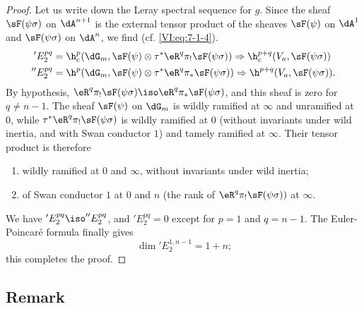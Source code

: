 \documentclass[oneside]{book}
\begin{document}
\begin{proof}[Proof]
Let us write down the Leray spectral sequence for $g$. Since the sheaf $\sF(\psi\sigma)$ on 
$\dA^{n+1}$ is the external tensor product of the sheaves $\sF(\psi)$ on 
$\dA^1$ and $\sF(\psi\sigma)$ on $\dA^n$, we find (cf. \eqref{VI:eq:7-1-4}). 
\begin{align*}
  'E_2^{p q} &= \h_c^p(\dG_m,\sF(\psi)\otimes \tau^\ast \eR^q \pi_! \sF(\psi\sigma)) \Rightarrow \h_c^{p+q}(V_a,\sF(\psi\sigma)) \\
  ''E_2^{p q} &= \h^p(\dG_m,\sF(\psi)\otimes \tau^\ast \eR^q \pi_\ast \sF(\psi\sigma)) \Rightarrow \h^{p+q}(V_a,\sF(\psi\sigma)) \text{.} 
\end{align*}
By hypothesis, 
$\eR^q \pi_! \sF(\psi\sigma) \iso \eR^q \pi_\ast \sF(\psi\sigma)$, and this 
sheaf is zero for $q\ne n-1$. The sheaf $\sF(\psi)$ on $\dG_m$ is 
wildly ramified at $\infty$ and unramified at $0$, while 
$\tau^\ast \eR^q \pi_! \sF(\psi\sigma)$ is wildly ramified at $0$ (without 
invariants under wild inertia, and with Swan conductor $1$) and tamely 
ramified at $\infty$. Their tensor product is therefore 
\begin{enumerate}[\indent a)]
  \item wildly ramified at $0$ and $\infty$, without invariants under wild 
    inertia; 
  \item of Swan conductor $1$ at $0$ and $n$ (the rank of 
    $\eR^q \pi_! \sF(\psi\sigma))$ at $\infty$. 
\end{enumerate}
We have $'E_2^{p q} \iso ''E_2^{p q}$, and $'E_2^{p q}=0$ except for $p=1$ and 
$q=n-1$. The Euler-Poincaré formula finally gives 
\[
  \dim{'E_2^{1,n-1}} = 1+n \text{;} 
\]
this completes the proof. 
\end{proof}





\subsection{Remark}\label{VI:7-15}
\end{document}
